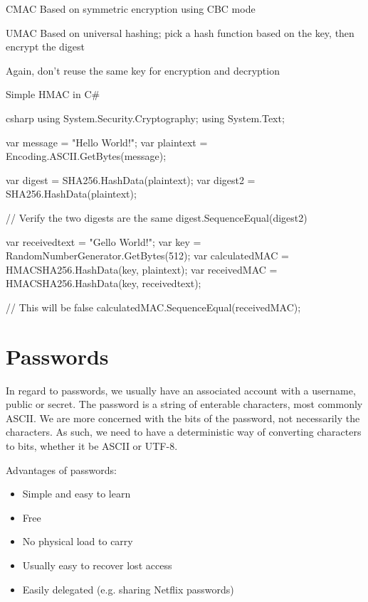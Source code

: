 \documentclass[12pt]{report}
\begin{document}
\begin{dfnbox}{CMAC}{}
    Based on symmetric encryption using CBC mode
\end{dfnbox}


\begin{dfnbox}{UMAC}{}
    Based on universal hashing; pick a hash function based on the key, then encrypt the digest
\end{dfnbox}

Again, don't reuse the same key for encryption and decryption

\begin{codebox}{Simple HMAC in C\#}{}{}
    \begin{amzcode}{csharp}
using System.Security.Cryptography;
using System.Text;

var message = "Hello World!";
var plaintext = Encoding.ASCII.GetBytes(message);

var digest = SHA256.HashData(plaintext);
var digest2 = SHA256.HashData(plaintext);

// Verify the two digests are the same
digest.SequenceEqual(digest2)

var receivedtext = "Gello World!";
var key = RandomNumberGenerator.GetBytes(512);
var calculatedMAC = HMACSHA256.HashData(key, plaintext);
var receivedMAC = HMACSHA256.HashData(key, receivedtext);

// This will be false
calculatedMAC.SequenceEqual(receivedMAC);
    \end{amzcode}
\end{codebox}

\section{Passwords}
In regard to passwords, we usually have an associated account with a username, public or secret. The password is a string of enterable characters, most commonly ASCII. We are more concerned with the bits of the password, not necessarily the characters. As such, we need to have a deterministic way of converting characters to bits, whether it be ASCII or UTF-8.

Advantages of passwords:
\begin{itemize}[noitemsep]
    \item Simple and easy to learn
    \item Free
    \item No physical load to carry
    \item Usually easy to recover lost access
    \item Easily delegated (e.g. sharing Netflix passwords)
\end{itemize}
\end{document}
